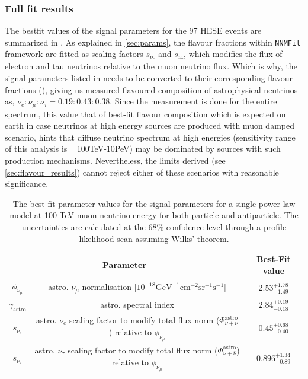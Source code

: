 \subsubsection{Full fit results}
\label{final_fit}
The bestfit values of the signal parameters for the 97 HESE events are summarized in . As explained in \ref{sec:params}, the flavour fractions within \texttt{NNMFit} framework are fitted as scaling factors $s_{\nu_{e}}$ and $s_{\nu_{\tau}}$, which modifies the flux of electron and tau neutrinos relative to the muon neutrino flux. Which is why, the signal parameters listed in  needs to be converted to their corresponding flavour fractions (), giving us measured flavoured composition of astrophysical neutrinos as, \textbf{$\nu_e:\nu_{\mu}:\nu_{\tau} = 0.19:0.43:0.38$}. Since the measurement is done for the entire spectrum, this value that of best-fit flavour composition which is expected on earth in case neutrinos at high energy sources are produced with muon damped scenario, hints that diffuse neutrino spectrum at high energies (sensitivity range of this analysis is ~ 100TeV-10PeV) may be dominated by sources with such production mechanisms. Nevertheless, the limits derived (see \ref{sec:flavour_results}) cannot reject either of these scenarios with reasonable significance. 

\begin{table}[h]
    \caption{The best-fit parameter values for the signal parameters for a single power-law model at 100 TeV muon neutrino energy for both particle and antiparticle. The uncertainties are calculated at the 68\% confidence level through a profile likelihood scan assuming Wilks' theorem.}
    {\renewcommand{\arraystretch}{1.4}
    \begin{tabular}{ c c |c}
        
        \hline
        \multicolumn{2}{c|}{Parameter}  & Best-Fit value\\
        \hline
        \hline
        $\phi_{\nu_{\mu}}$ &astro. $\nu_{\mu}$ normalisation [$10^{-18} \mathrm{GeV}^{-1}\mathrm{cm}^{-2}\mathrm{sr}^{-1}\mathrm{s}^{-1}$]& $2.53_{-1.49}^{+1.78}$\\
        \hline
        $\gamma_{\mathrm{astro}}$ &astro. spectral index & $2.84_{-0.18}^{+0.19}$\\
        \hline
        $s_{\nu_e}$ &astro. $\nu_{e}$ scaling factor to modify total flux norm ($\Phi_{\nu+\bar\nu}^{\mathrm{astro}}$) relative to $\phi_{\nu_{\mu}}$ & $0.45_{-0.40}^{+0.68}$\\
        \hline
        $s_{\nu_{\tau}}$ &astro. $\nu_{\tau}$ scaling factor to modify total flux norm ($\Phi_{\nu+\bar\nu}^{\mathrm{astro}}$) relative to $\phi_{\nu_{\mu}}$ & $0.896_{-0.89}^{+1.34}$\\
        \hline
        \hline
    \end{tabular}
    }
\end{table}


